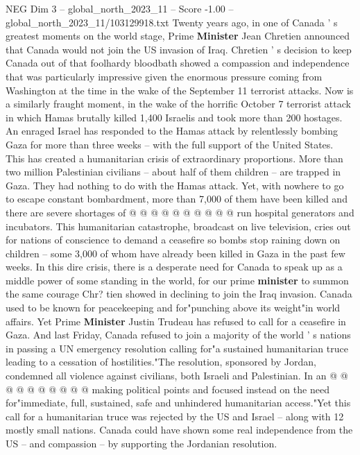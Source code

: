 \begin{textsample}{NEG Dim 3 – global\_north\_2023\_11 – Score -1.00 – global\_north\_2023\_11/103129918.txt}  \label{ex:f3_neg_290}
Twenty years ago, in one of Canada ' s greatest moments on the world stage, Prime \textbf{Minister} Jean Chretien announced that Canada would not join the US invasion of Iraq.
Chretien ' s decision to keep Canada out of that foolhardy bloodbath showed a compassion and independence that was particularly impressive given the enormous pressure coming from Washington at the time in the wake of the September 11 terrorist attacks.
Now is a similarly fraught moment, in the wake of the horrific October 7 terrorist attack in which Hamas brutally killed 1,400 Israelis and took more than 200 hostages.
An enraged Israel has responded to the Hamas attack by relentlessly bombing Gaza for more than three weeks -- with the full support of the United States.
This has created a humanitarian crisis of extraordinary proportions.
More than two million Palestinian civilians -- about half of them children -- are trapped in Gaza.
They had nothing to do with the Hamas attack.
Yet, with nowhere to go to escape constant bombardment, more than 7,000 of them have been killed and there are severe shortages of @ @ @ @ @ @ @ @ @ @ run hospital generators and incubators.
This humanitarian catastrophe, broadcast on live television, cries out for nations of conscience to demand a ceasefire so bombs stop raining down on children -- some 3,000 of whom have already been killed in Gaza in the past few weeks.
In this dire crisis, there is a desperate need for Canada to speak up as a middle power of some standing in the world, for our prime \textbf{minister} to summon the same courage Chr? tien showed in declining to join the Iraq invasion.
Canada used to be known for peacekeeping and for"punching above its weight"in world affairs.
Yet Prime \textbf{Minister} Justin Trudeau has refused to call for a ceasefire in Gaza.
And last Friday, Canada refused to join a majority of the world ' s nations in passing a UN emergency resolution calling for"a sustained humanitarian truce leading to a cessation of hostilities."The resolution, sponsored by Jordan, condemned all violence against civilians, both Israeli and Palestinian.
In an @ @ @ @ @ @ @ @ @ @ making political points and focused instead on the need for"immediate, full, sustained, safe and unhindered humanitarian access."Yet this call for a humanitarian truce was rejected by the US and Israel -- along with 12 mostly small nations.
Canada could have shown some real independence from the US -- and compassion -- by supporting the Jordanian resolution.

\end{textsample}
